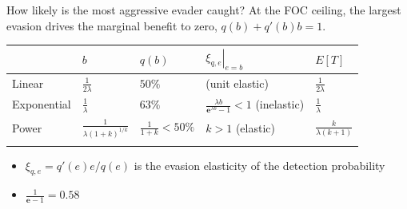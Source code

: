 \documentclass[
  ignorenonframetext,
  aspectratio=169,
]{beamer}
\newcounter{none} %
\providecommand{\tightlist}{%
  \setlength{\itemsep}{0pt}\setlength{\parskip}{0pt}}
\begin{document}
\begin{frame}{How likely is the most aggressive evader caught?}
\protect{}\label{how-likely-is-the-most-aggressive-evader-caught}
At the FOC ceiling, the largest evasion drives the marginal benefit to
zero, \(q(b)+q'(b)b=1\).

{\def\LTcaptype{none} %
\begin{longtable}[]{@{}
  >{\raggedright\arraybackslash}p{}
  >{\centering\arraybackslash}p{}
  >{\centering\arraybackslash}p{}
  >{\centering\arraybackslash}p{}
  >{\centering\arraybackslash}p{}@{}}
\toprule\noalign{}
\begin{minipage}[b]{\linewidth}\raggedright
\end{minipage} & \begin{minipage}[b]{\linewidth}\centering
\(b\)
\end{minipage} & \begin{minipage}[b]{\linewidth}\centering
\(q(b)\)
\end{minipage} & \begin{minipage}[b]{\linewidth}\centering
\(\left.\xi_{q,e}\right|_{e=b}\)
\end{minipage} & \begin{minipage}[b]{\linewidth}\centering
\(E[T]\)
\end{minipage} \\
\midrule\noalign{}
\endhead
Linear & \(\frac{1}{2\lambda}\) & \(50\%\) & 1 (unit elastic) &
\(\frac{1}{2\lambda}\) \\
Exponential & \(\frac{1}{\lambda}\) & \(63\%\) &
\(\tfrac{\lambda b}{\textbf{e}^{\lambda b}-1}<1\) (inelastic) &
\(\frac{1}{\lambda}\) \\
Power & \(\frac{1}{\lambda(1+k)^{1/k}}\) & \(\tfrac{1}{1+k}<50\%\) &
\(k>1\) (elastic) & \(\frac{k}{\lambda(k+1)}\) \\
\bottomrule\noalign{}
\end{longtable}
}

\begin{itemize}
\tightlist
\item
  \(\xi_{q,e}=q'(e)e/q(e)\) is the evasion elasticity of the detection
  probability
\item
  \(\frac{1}{\textbf{e}-1}=0.58\)
\end{itemize}
\end{frame}
\end{document}
